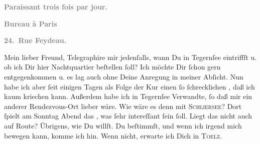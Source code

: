 \pstart
           \begin{otherlanguage}{french}\textcolor{gray}{\textbf{\textbf{Paraissant trois fois par jour.}}}\end{otherlanguage}\pend
           
\pstart
           \begin{otherlanguage}{french}\textcolor{gray}{\textbf{\textbf{Bureau à Paris}}}\end{otherlanguage}\pend
           
\pstart
           \begin{otherlanguage}{french}\textcolor{gray}{\textbf{\textbf{24. Rue Feydeau.}}}\end{otherlanguage}\pend
           
\pstart\center{}Mein lieber Freund,\pend\vspace{0.5em}
\pstart
           Telegraphire mir jedenſalls, \strikeout{\textcolor{gray}{ob}} wann Du in Tegernſee eintriffſt u. ob
               ich Dir hier Nachtquartier beſtellen{ }ſoll? Ich möchte Dir{ }ſchon gern entgegenkommen
               u. es lag auch ohne Deine Anregung in meiner Abſicht. Nun habe ich aber{ }ſeit einigen
               Tagen als Folge der Kur einen{ }ſo{ }ſchrecklichen \label{K_L02746-1v}\label{K_L02746-1}, daß ich kaum kriechen kann. Außerdem habe
               ich in Tegernſee Verwandte,{ }ſo daß mir ein
               anderer Rendezvous-Ort lieber wäre. Wie wäre es denn mit \textsc{Schliersee}? Dort {\pb}ſpielt am Sonntag{ }Abend das \label{K_L02746-2v}\label{K_L02746-2}, was{ }ſehr intereſſant{ }ſein{ }ſoll. Liegt das nicht auch auf \label{K_L02746-3v}\label{K_L02746-3} Route? Übrigens, wie Du
               willſt. Du beſtimmſt, und wenn ich irgend mich bewegen kann, komme ich hin. Wenn
               nicht, erwarte ich Dich in \textsc{Toelz}.\pend
           
